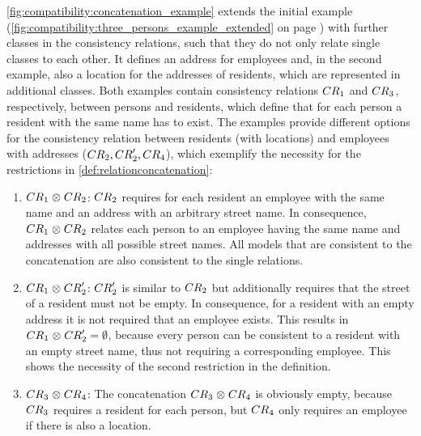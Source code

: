 \begin{example}
\autoref{fig:compatibility:concatenation_example} extends the initial example (\autoref{fig:compatibility:three_persons_example_extended} on page \pageref{fig:compatibility:three_persons_example_extended}) with further classes in the consistency relations, such that they do not only relate single classes to each other.
It defines an address for employees and, in the second example, also a location for the addresses of residents, which are represented in additional classes.
Both examples contain consistency relations $\consistencyrelation{CR}{1}$ and $\consistencyrelation{CR}{3}$, respectively, between persons and residents, which define that for each person a resident with the same name has to exist.
The examples provide different options for the consistency relation between residents (with locations) and employees with addresses ($\consistencyrelation{CR}{2}, \consistencyrelation{CR}{2}', \consistencyrelation{CR}{4}$), which exemplify the necessity for the restrictions in \autoref{def:relationconcatenation}:
\begin{enumerate}
    \item $\consistencyrelation{CR}{1} \concat \consistencyrelation{CR}{2}$: 
$\consistencyrelation{CR}{2}$ requires for each resident an employee with the same name and an address with an arbitrary street name.
In consequence, $\consistencyrelation{CR}{1} \concat \consistencyrelation{CR}{2}$ relates each person to an employee having the same name and addresses with all possible street names.
All models that are consistent to the concatenation are also consistent to the single relations.
    \item $\consistencyrelation{CR}{1} \concat \consistencyrelation{CR}{2}'$: 
$\consistencyrelation{CR}{2}'$ is similar to $\consistencyrelation{CR}{2}$ but additionally requires that the street of a resident must not be empty. 
In consequence, for a resident with an empty address it is not required that an employee exists.
This results in $\consistencyrelation{CR}{1} \concat \consistencyrelation{CR}{2}' = \emptyset$, because every person can be consistent to a resident with an empty street name, thus not requiring a corresponding employee.
This shows the necessity of the second restriction in the definition. 
    \item $\consistencyrelation{CR}{3} \concat \consistencyrelation{CR}{4}$: 
The concatenation $\consistencyrelation{CR}{3} \concat \consistencyrelation{CR}{4}$ is obviously empty, because $\consistencyrelation{CR}{3}$ requires a resident for each person, but $\consistencyrelation{CR}{4}$ only requires an employee if there is also a location.

\end{enumerate}
\end{example}
